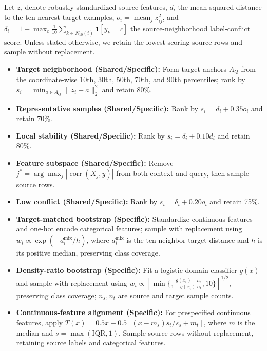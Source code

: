 Let $z_i$ denote robustly standardized source features, $d_i$ the mean squared distance to the ten nearest target examples, $o_i=\operatorname{mean}_j z_{ij}^2$, and $\delta_i=1-\max_c\frac1{10}\sum_{k\in N_{10}(i)}\mathbf1[y_k=c]$ the source-neighborhood label-conflict score. Unless stated otherwise, we retain the lowest-scoring source rows and sample without replacement.

\begin{itemize}

\item \textbf{Target neighborhood (Shared/Specific):} Form target anchors $A_Q$ from the coordinate-wise 10th, 30th, 50th, 70th, and 90th percentiles; rank by $s_i=\min_{a\in A_Q}\|z_i-a\|_2^2$ and retain 80\%.

\item \textbf{Representative samples (Shared/Specific):} Rank by $s_i=d_i+0.35o_i$ and retain 70\%.

\item \textbf{Local stability (Shared/Specific):} Rank by $s_i=\delta_i+0.10d_i$ and retain 80\%.

\item \textbf{Feature subspace (Shared/Specific):} Remove $j^*=\arg\max_j|\operatorname{corr}(X_j,y)|$ from both context and query, then sample source rows.

\item \textbf{Low conflict (Shared/Specific):} Rank by $s_i=\delta_i+0.20o_i$ and retain 75\%.

\item \textbf{Target-matched bootstrap (Specific):} Standardize continuous features and one-hot encode categorical features; sample with replacement using $w_i\propto\exp(-d_i^{\mathrm{mix}}/h)$, where $d_i^{\mathrm{mix}}$ is the ten-neighbor target distance and $h$ is its positive median, preserving class coverage.

\item \textbf{Density-ratio bootstrap (Specific):} Fit a logistic domain classifier $g(x)$ and sample with replacement using $w_i\propto[\min\{\frac{g(x_i)}{1-g(x_i)}\frac{n_s}{n_t},10\}]^{1/2}$, preserving class coverage; $n_s,n_t$ are source and target sample counts.

\item \textbf{Continuous-feature alignment (Specific):} For prespecified continuous features, apply $T(x)=0.5x+0.5[(x-m_s)s_t/s_s+m_t]$, where $m$ is the median and $s=\max(\mathrm{IQR},1)$. Sample source rows without replacement, retaining source labels and categorical features.

\end{itemize}


